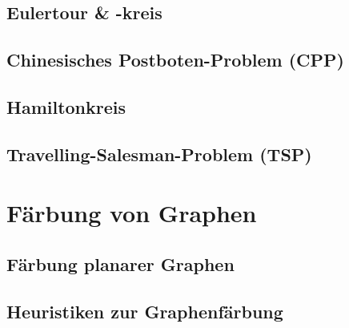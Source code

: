 \documentclass[10pt,a4paper,landscape]{article}
\begin{document}
\begin{multicols*}{2}
            \subsection{ Eulertour \& -kreis}

            \subsection{ Chinesisches Postboten-Problem (CPP) }

            \subsection{ Hamiltonkreis }

            \subsection{ Travelling-Salesman-Problem (TSP) }


        \section{ Färbung von Graphen }
            \subsection{ Färbung planarer Graphen }

            \subsection{ Heuristiken zur Graphenfärbung }


    \end{multicols*}
\end{document}
